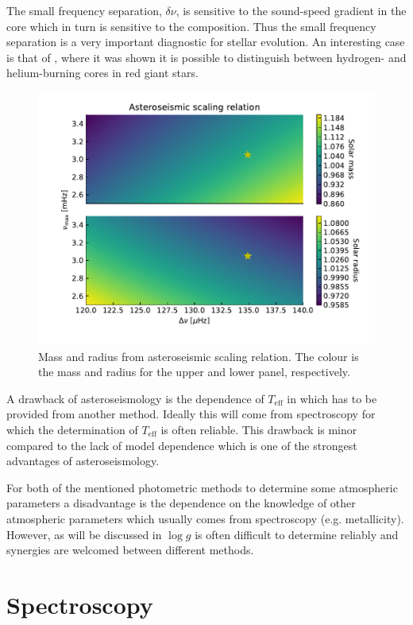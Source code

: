 The small frequency separation, $\delta\nu$, is sensitive to the sound-speed
gradient in the core which in turn is sensitive to the composition. Thus the
small frequency separation is a very important diagnostic for stellar evolution.
An interesting case is that of \citet{Bedding2011}, where it was shown it is
possible to distinguish between hydrogen- and helium-burning cores in red giant
stars.

\begin{figure}[htpb!]
    \centering
    \includegraphics[width=0.85\linewidth]{figures/scaling_relation.pdf}
    \caption{Mass and radius from asteroseismic scaling relation. The colour
             is the mass and radius for the upper and lower panel, respectively.}
    \label{fig:scaling}
\end{figure}

A drawback of asteroseismology is the dependence of $T_\mathrm{eff}$ in
 which has to be provided from another method. Ideally this
will come from spectroscopy for which the determination of $T_\mathrm{eff}$ is
often reliable. This drawback is minor compared to the lack of model dependence
which is one of the strongest advantages of asteroseismology.

For both of the mentioned photometric methods to determine some atmospheric
parameters a disadvantage is the dependence on the knowledge of other
atmospheric parameters which usually comes from spectroscopy (e.g. metallicity).
However, as will be discussed in  $\log g$ is
often difficult to determine reliably and synergies are welcomed between
different methods.

\section{Spectroscopy}
\label{sec:method_spectroscopy}

